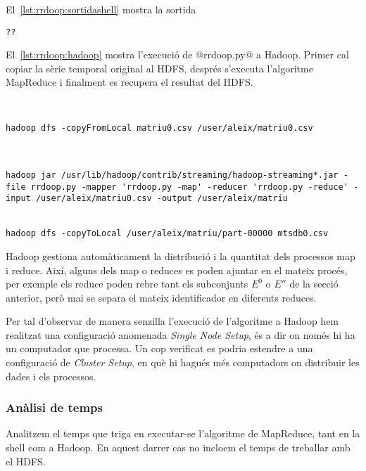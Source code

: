 El~\autoref{lst:rrdoop:sortidashell} mostra la sortida\todo{}

\begin{lstlisting}[style=stdout,caption=Sortida de rrdoop.py -reduce,label=lst:rrdoop:sortidashell]
??
\end{lstlisting}



El~\autoref{lst:rrdoop:hadoop} mostra l'execució de @rrdoop.py@ a
Hadoop. Primer cal copiar la sèrie temporal original al \gls{HDFS},
després s'executa l'algoritme MapReduce i finalment es recupera el
resultat del \gls{HDFS}.\todo{}



\begin{lstlisting}[style=sh,caption=Execució a Hadoop de
  rrdoop.py,label=lst:rrdoop:hadoop]


hadoop dfs -copyFromLocal matriu0.csv /user/aleix/matriu0.csv



hadoop jar /usr/lib/hadoop/contrib/streaming/hadoop-streaming*.jar -file rrdoop.py -mapper 'rrdoop.py -map' -reducer 'rrdoop.py -reduce' -input /user/aleix/matriu0.csv -output /user/aleix/matriu


hadoop dfs -copyToLocal /user/aleix/matriu/part-00000 mtsdb0.csv

\end{lstlisting}


Hadoop gestiona automàticament la distribució i la quantitat dels
processos map i reduce. Així, alguns dels map o reduces es poden
ajuntar en el mateix procés, per exemple els reduce poden rebre tant
els subconjunts $E^0$ o $E''$ de la secció anterior, però mai se
separa el mateix identificador en diferents reduces.


Per tal d'observar de manera senzilla l'execució de l'algoritme a
Hadoop hem realitzat una configuració anomenada \emph{Single Node
  Setup}, és a dir on només hi ha un computador que processa.  Un cop
verificat es podria estendre a una configuració de \emph{Cluster
  Setup}, en què hi hagués més computadors on distribuir les dades i
els processos.




\subsubsection{Anàlisi de temps}

Analitzem el temps que triga en executar-se l'algoritme de MapReduce,
tant en la shell com a Hadoop. En aquest darrer cas no incloem el
temps de treballar amb el \gls{HDFS}.


